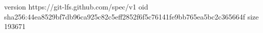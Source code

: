 version https://git-lfs.github.com/spec/v1
oid sha256:44ea8529bf7db96ca925c82c5eff2852f6f5c76141fe9bb765ea5bc2c365664f
size 193671
